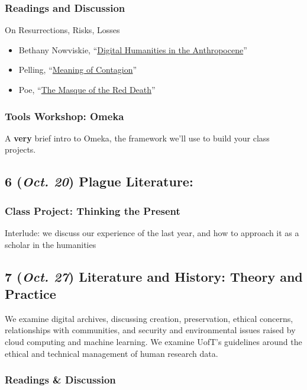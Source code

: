 \documentclass[11pt]{article}
\begin{document}
\subsubsection*{Readings and Discussion}
\label{sec:org6c4b99a}
On Resurrections, Risks, Losses
\begin{itemize}
\item Bethany Nowviskie, “\href{http://nowviskie.org/2014/anthropocene/}{Digital Humanities in the Anthropocene}”
\item Pelling,  ``\href{https://q.utoronto.ca/courses/219069/files/folder/Readings}{Meaning of Contagion}''
\item Poe, ``\href{https://www.gutenberg.org/files/1064/1064-h/1064-h.htm}{The Masque of the Red Death}''
\end{itemize}
\subsubsection*{Tools Workshop: Omeka}
\label{sec:orgf045a98}
A \textbf{very} brief intro to Omeka, the framework we'll use to build your class projects.

\subsection*{6 (\textit{Oct. 20}) Plague Literature:}
\label{sec:org91dd24f}
\subsubsection*{Class Project: Thinking the Present}
\label{sec:org0783f49}
Interlude: we discuss our experience of the last year, and how to approach it as a scholar in the humanities

\subsection*{7 (\textit{Oct. 27}) Literature and History: Theory and Practice}
\label{sec:org3461094}
We examine digital archives, discussing creation, preservation, ethical concerns, relationships with communities, and security and environmental issues raised by cloud computing and machine learning.  We examine UofT’s guidelines around the ethical and technical management of human research data.
\subsubsection*{Readings \& Discussion}
\label{sec:org18d742d}
\end{document}
